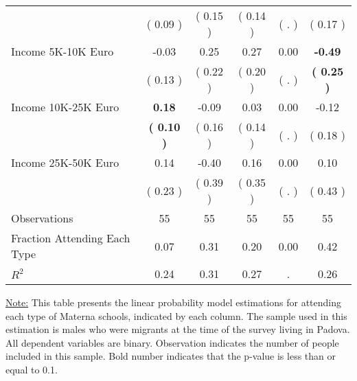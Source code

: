 \begin{table}[H]
{\begin{tabular}{lccccc}
\quad  & (     0.09 ) & (     0.15 )  & (     0.14 )  & (        . ) & (     0.17 ) \\
\quad Income 5K-10K Euro &     -0.03 &      0.25 &      0.27 &      0.00 & \textbf{    -0.49} \\
\quad  & (     0.13 ) & (     0.22 )  & (     0.20 )  & (        . ) & \textbf{(     0.25 )} \\
\quad Income 10K-25K Euro & \textbf{     0.18} &     -0.09 &      0.03 &      0.00 &     -0.12 \\
\quad  & \textbf{(     0.10 )} & (     0.16 )  & (     0.14 )  & (        . ) & (     0.18 ) \\
\quad Income 25K-50K Euro &      0.14 &     -0.40 &      0.16 &      0.00 &      0.10 \\
\quad  & (     0.23 ) & (     0.39 )  & (     0.35 )  & (        . ) & (     0.43 ) \\
\midrule
Observations & 55 & 55 & 55 & 55 & 55 \\
Fraction Attending Each Type &      0.07 &      0.31 &      0.20 &      0.00 &      0.42 \\
\midrule
$ R^2$ &      0.24 &      0.31 &      0.27 &         . &      0.26 \\
\bottomrule
\end{tabular}}
\end{table}
\begin{footnotesize}
\noindent\underline{Note:} This table presents the linear probability model estimations for attending each type of Materna schools, indicated by each column. The sample used in this estimation is males who were migrants at the time of the survey living in Padova. All dependent variables are binary. Observation indicates the number of people included in this sample. Bold number indicates that the p-value is less than or equal to 0.1.
\end{footnotesize}
